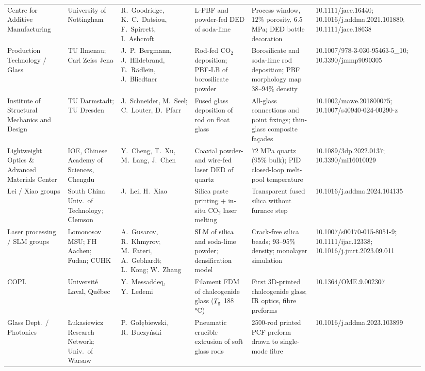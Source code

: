 \begin{table}
\begin{tabular}{@{}L{2.9cm}L{2.5cm}L{2.8cm}L{2.9cm}L{4.2cm}L{4.2cm}@{}}
    Centre for Additive Manufacturing & University of Nottingham & R.\ Goodridge, K.\ C.\ Datsiou, F.\ Spirrett, I.\ Ashcroft & L-PBF and powder-fed DED of soda-lime & Process window, 12\% porosity, 6.5 MPa; DED bottle decoration & 10.1111/jace.16440; 10.1016/j.addma.2021.101880; 10.1111/jace.18638\\
    Production Technology / Glass & TU Ilmenau; Carl Zeiss Jena & J.\ P.\ Bergmann, J.\ Hildebrand, E.\ R{\"a}dlein, J.\ Bliedtner & Rod-fed CO\(_2\) deposition; PBF-LB of borosilicate powder & Borosilicate and soda-lime rod deposition; PBF morphology map 38--94\% density & 10.1007/978-3-030-95463-5\_10; 10.3390/jmmp9090305\\
    Institute of Structural Mechanics and Design & TU Darmstadt; TU Dresden & J.\ Schneider, M.\ Seel; C.\ Louter, D.\ Pfarr & Fused glass deposition of rod on float glass & All-glass connections and point fixings; thin-glass composite fa\c{c}ades & 10.1002/mawe.201800075; 10.1007/s40940-024-00290-z\\
    Lightweight Optics \& Advanced Materials Center & IOE, Chinese Academy of Sciences, Chengdu & Y.\ Cheng, T.\ Xu, M.\ Lang, J.\ Chen & Coaxial powder- and wire-fed laser DED of quartz & 72 MPa quartz (95\% bulk); PID closed-loop melt-pool temperature & 10.1089/3dp.2022.0137; 10.3390/mi16010029\\
    Lei / Xiao groups & South China Univ.\ of Technology; Clemson & J.\ Lei, H.\ Xiao & Silica paste printing + in-situ CO\(_2\) laser melting & Transparent fused silica without furnace step & 10.1016/j.addma.2024.104135\\
    Laser processing / SLM groups & Lomonosov MSU; FH Aachen; Fudan; CUHK & A.\ Gusarov, R.\ Khmyrov; M.\ Fateri, A.\ Gebhardt; L.\ Kong; W.\ Zhang & SLM of silica and soda-lime powder; densification model & Crack-free silica beads; 93--95\% density; monolayer simulation & 10.1007/s00170-015-8051-9; 10.1111/ijac.12338; 10.1016/j.jmrt.2023.09.011\\
    COPL & Universit\'e Laval, Qu\'ebec & Y.\ Messaddeq, Y.\ Ledemi & Filament FDM of chalcogenide glass (\(T_{\mathrm{g}}\) 188 \si{\celsius}) & First 3D-printed chalcogenide glass; IR optics, fibre preforms & 10.1364/OME.9.002307\\
    Glass Dept.\ / Photonics & \L{}ukasiewicz Research Network; Univ.\ of Warsaw & P.\ Go\l{}\k{e}biewski, R.\ Buczy\'nski & Pneumatic crucible extrusion of soft glass rods & 2500-rod printed PCF preform drawn to single-mode fibre & 10.1016/j.addma.2023.103899\\

\end{tabular}
\end{table}
